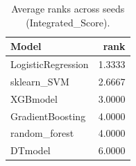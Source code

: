 \begin{table}[t]
\centering
\begin{tabular}{lr}
\toprule
Model & rank \\
\midrule
LogisticRegression & 1.3333 \\
sklearn_SVM & 2.6667 \\
XGBmodel & 3.0000 \\
GradientBoosting & 4.0000 \\
random_forest & 4.0000 \\
DTmodel & 6.0000 \\
\bottomrule
\end{tabular}
\caption{Average ranks across seeds (Integrated_Score).}
\label{tab:avg_rank_Integrated_Score}
\end{table}